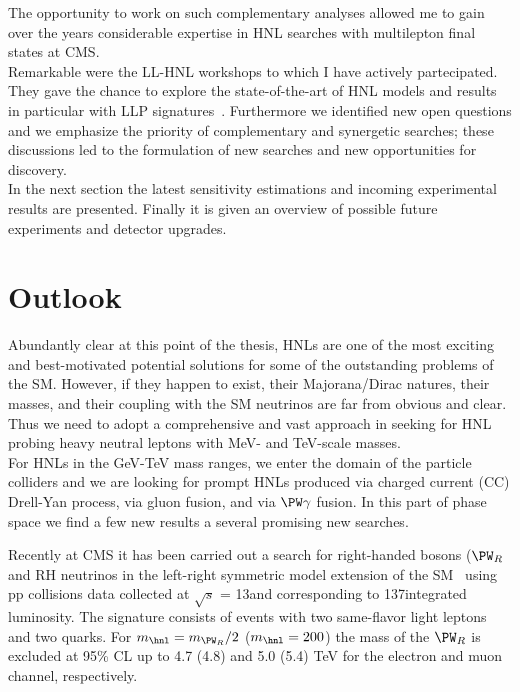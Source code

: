 The opportunity to work on such complementary analyses
allowed me to gain over the years considerable expertise in HNL
searches with multilepton final states at CMS.\\
Remarkable were the LL-HNL workshops to which I have actively
partecipated. They gave the chance to explore the 
state-of-the-art of HNL models and results in particular with LLP
signatures~\cite{Alimena_2020}. Furthermore we identified new open questions and
we emphasize the priority 
of complementary and synergetic searches; these discussions
led to the formulation of new searches and new opportunities
for discovery.\\

In the next section the latest sensitivity
estimations and incoming experimental results are presented. Finally
it is given 
an overview of possible future experiments
and detector upgrades. 


\section{Outlook}
Abundantly clear at this point of the thesis, HNLs are one of the most
exciting and best-motivated potential solutions for some of the
outstanding problems of the SM. However, if they happen to exist, their
Majorana/Dirac natures, their masses, and their coupling with the SM
neutrinos are far from obvious and clear. Thus we need to adopt a
comprehensive and vast approach in seeking for HNL probing heavy
neutral leptons with MeV- and TeV-scale masses.\\

For HNLs in the GeV-TeV mass ranges, we enter the domain of the
particle colliders and we are looking for prompt HNLs produced via charged current (CC) Drell-Yan
process, via gluon fusion, and via $\PW \gamma$ fusion. 
In this part of phase space we find a few new results a several
promising new searches.

Recently at CMS it has been carried out a search for right-handed bosons ($\PW_R$
and RH neutrinos in the left-right symmetric model extension of the
SM~\cite{CMS-PAS-EXO-20-002} using pp collisions data collected at $\sqrt{s}$ =
 13\TeV and corresponding to 137\fbinv integrated luminosity. The
 signature consists of events with two same-flavor light leptons and
 two quarks. For $m_\hnl = m_{\PW_{R}}/2$ ($m_\hnl = 200$\GeV) the
 mass of the $\PW_R$ is excluded at 95\% CL up to 4.7 (4.8) and 5.0 (5.4) TeV for the electron and muon
channel, respectively. 

